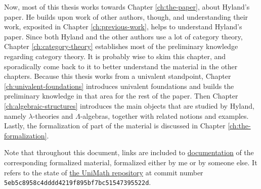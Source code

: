 Now, most of this thesis works towards Chapter \ref{ch:the-paper}, about Hyland's paper.
He builds upon work of other authors, though, and understanding their work, exposited in Chapter \ref{ch:previous-work}, helps to understand Hyland's paper.
Since both Hyland and the other authors use a lot of category theory, Chapter \ref{ch:category-theory} establishes most of the preliminary knowledge regarding category theory. It is probably wise to skim this chapter, and sporadically come back to it to better understand the material in the other chapters.
Because this thesis works from a univalent standpoint, Chapter \ref{ch:univalent-foundations} introduces univalent foundations and builds the preliminary knowledge in that area for the rest of the paper.
Then Chapter \ref{ch:algebraic-structures} introduces the main objects that are studied by Hyland, namely $ \lambda $-theories and $ \Lambda $-algebras, together with related notions and examples.
Lastly, the formalization of part of the material is discussed in Chapter \ref{ch:the-formalization}.

Note that throughout this document, links are included to \href{https://arnoudvanderleer.github.io/cs-masters-thesis/toc.html}{documentation} of the corresponding formalized material, formalized either by me or by someone else. It refers to the state of \href{https://github.com/UniMath/UniMath/tree/5eb5c8958c4dddd4219f895bf7bc51547395522d}{the UniMath repository} at commit number \texttt{5eb5c8958c4dddd4219f895bf7bc51547395522d}.
